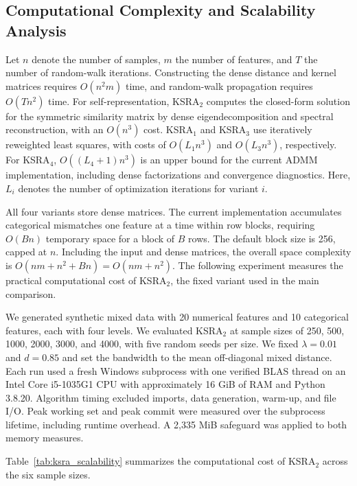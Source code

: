 \documentclass[ASNA,twocolumn]{USG} %
\begin{document}
\subsection{Computational Complexity and Scalability Analysis}

Let $n$ denote the number of samples, $m$ the number of features, and $T$ the number of random-walk iterations. Constructing the dense distance and kernel matrices requires $O(n^2m)$ time, and random-walk propagation requires $O(Tn^2)$ time. For self-representation, KSRA$_2$ computes the closed-form solution for the symmetric similarity matrix by dense eigendecomposition and spectral reconstruction, with an $O(n^3)$ cost. KSRA$_1$ and KSRA$_3$ use iteratively reweighted least squares, with costs of $O(L_1n^3)$ and $O(L_3n^3)$, respectively. For KSRA$_4$, $O((L_4+1)n^3)$ is an upper bound for the current ADMM implementation, including dense factorizations and convergence diagnostics. Here, $L_i$ denotes the number of optimization iterations for variant $i$.

All four variants store dense matrices. The current implementation accumulates categorical mismatches one feature at a time within row blocks, requiring $O(Bn)$ temporary space for a block of $B$ rows. The default block size is 256, capped at $n$. Including the input and dense matrices, the overall space complexity is $O(nm+n^2+Bn)=O(nm+n^2)$. The following experiment measures the practical computational cost of KSRA$_2$, the fixed variant used in the main comparison.

We generated synthetic mixed data with 20 numerical features and 10 categorical features, each with four levels. We evaluated KSRA$_2$ at sample sizes of 250, 500, 1000, 2000, 3000, and 4000, with five random seeds per size. We fixed $\lambda=0.01$ and $d=0.85$ and set the bandwidth to the mean off-diagonal mixed distance. Each run used a fresh Windows subprocess with one verified BLAS thread on an Intel Core i5-1035G1 CPU with approximately 16 GiB of RAM and Python 3.8.20. Algorithm timing excluded imports, data generation, warm-up, and file I/O. Peak working set and peak commit were measured over the subprocess lifetime, including runtime overhead. A 2,335 MiB safeguard was applied to both memory measures.

Table~\ref{tab:ksra_scalability} summarizes the computational cost of KSRA$_2$ across the six sample sizes.
\end{document}
